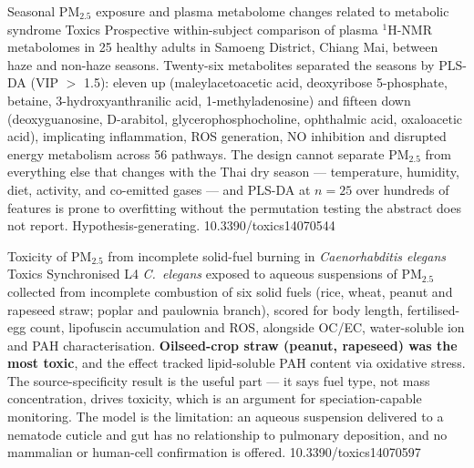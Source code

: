 \documentclass[10pt]{article}
\begin{document}

{Seasonal PM$_{2.5}$ exposure and plasma metabolome changes related to metabolic syndrome}
{Toxics}
{Prospective within-subject comparison of plasma $^1$H-NMR metabolomes in 25 healthy
adults in Samoeng District, Chiang Mai, between haze and non-haze seasons.
Twenty-six metabolites separated the seasons by PLS-DA (VIP $>$ 1.5): eleven up
(maleylacetoacetic acid, deoxyribose 5-phosphate, betaine, 3-hydroxyanthranilic acid,
1-methyladenosine) and fifteen down (deoxyguanosine, D-arabitol, glycerophosphocholine,
ophthalmic acid, oxaloacetic acid), implicating inflammation, ROS generation, NO
inhibition and disrupted energy metabolism across 56 pathways. The design cannot separate
PM$_{2.5}$ from everything else that changes with the Thai dry season --- temperature,
humidity, diet, activity, and co-emitted gases --- and PLS-DA at $n=25$ over hundreds of
features is prone to overfitting without the permutation testing the abstract does not
report. Hypothesis-generating.}
{10.3390/toxics14070544}

{Toxicity of PM$_{2.5}$ from incomplete solid-fuel burning in \textit{Caenorhabditis elegans}}
{Toxics}
{Synchronised L4 \textit{C.\ elegans} exposed to aqueous suspensions of PM$_{2.5}$
collected from incomplete combustion of six solid fuels (rice, wheat, peanut and rapeseed
straw; poplar and paulownia branch), scored for body length, fertilised-egg count,
lipofuscin accumulation and ROS, alongside OC/EC, water-soluble ion and PAH
characterisation. \textbf{Oilseed-crop straw (peanut, rapeseed) was the most toxic}, and
the effect tracked lipid-soluble PAH content via oxidative stress. The source-specificity
result is the useful part --- it says fuel type, not mass concentration, drives toxicity,
which is an argument for speciation-capable monitoring. The model is the limitation: an
aqueous suspension delivered to a nematode cuticle and gut has no relationship to
pulmonary deposition, and no mammalian or human-cell confirmation is offered.}
{10.3390/toxics14070597}

\end{document}
